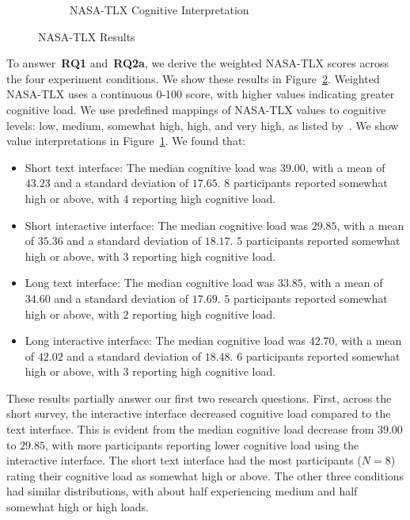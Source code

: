 \begin{figure}[ht]
\begin{subfigure}[b]{0.47\textwidth}
        \caption{NASA-TLX Cognitive Interpretation}
        \label{fig:nasatlx-final2}
    \end{subfigure}
    \caption{NASA-TLX Results}
    \label{fig:nasatlx-final}
\end{figure}

To answer~\textbf{RQ1} and~\textbf{RQ2a}, we derive the weighted NASA-TLX scores across the four experiment conditions. We show these results in Figure~\ref{fig:nasatlx-final}. Weighted NASA-TLX uses a continuous 0-100 score, with higher values indicating greater cognitive load. We use predefined mappings of NASA-TLX values to cognitive levels: low, medium, somewhat high, high, and very high, as listed by~\textcite{hart1988development}. We show value interpretations in Figure~\ref{fig:nasatlx-final2}. We found that:

\begin{itemize}
    \item Short text interface: The median cognitive load was $39.00$, with a mean of $43.23$ and a standard deviation of $17.65$. $8$ participants reported somewhat high or above, with $4$ reporting high cognitive load.
    \item Short interactive interface: The median cognitive load was $29.85$, with a mean of $35.36$ and a standard deviation of $18.17$. $5$ participants reported somewhat high or above, with $3$ reporting high cognitive load.
    \item Long text interface: The median cognitive load was $33.85$, with a mean of $34.60$ and a standard deviation of $17.69$. $5$ participants reported somewhat high or above, with $2$ reporting high cognitive load.
    \item Long interactive interface: The median cognitive load was $42.70$, with a mean of $42.02$ and a standard deviation of $18.48$. $6$ participants reported somewhat high or above, with $3$ reporting high cognitive load.
\end{itemize}

These results partially answer our first two research questions. First, across the short survey, the interactive interface decreased cognitive load compared to the text interface. This is evident from the median cognitive load decrease from $39.00$ to $29.85$, with more participants reporting lower cognitive load using the interactive interface. The short text interface had the most participants ($N=8$) rating their cognitive load as somewhat high or above. The other three conditions had similar distributions, with about half experiencing medium and half somewhat high or high loads.

